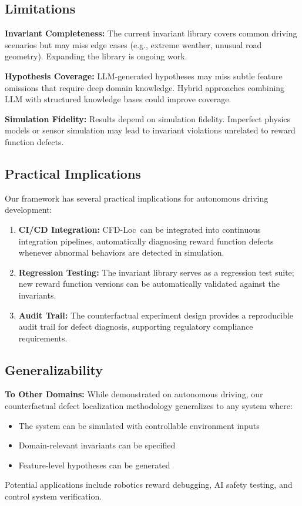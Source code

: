 \documentclass[conference]{IEEEtran}
\theoremstyle{plain}
\newcommand{\methodname}{CFD-Loc}
\begin{document}
\subsection{Limitations}

\textbf{Invariant Completeness:} The current invariant library covers common driving scenarios but may miss edge cases (e.g., extreme weather, unusual road geometry). Expanding the library is ongoing work.

\textbf{Hypothesis Coverage:} LLM-generated hypotheses may miss subtle feature omissions that require deep domain knowledge. Hybrid approaches combining LLM with structured knowledge bases could improve coverage.

\textbf{Simulation Fidelity:} Results depend on simulation fidelity. Imperfect physics models or sensor simulation may lead to invariant violations unrelated to reward function defects.

\subsection{Practical Implications}

Our framework has several practical implications for autonomous driving development:

\begin{enumerate}[nosep]
    \item \textbf{CI/CD Integration:} \methodname\ can be integrated into continuous integration pipelines, automatically diagnosing reward function defects whenever abnormal behaviors are detected in simulation.
    \item \textbf{Regression Testing:} The invariant library serves as a regression test suite; new reward function versions can be automatically validated against the invariants.
    \item \textbf{Audit Trail:} The counterfactual experiment design provides a reproducible audit trail for defect diagnosis, supporting regulatory compliance requirements.
\end{enumerate}

\subsection{Generalizability}

\textbf{To Other Domains:} While demonstrated on autonomous driving, our counterfactual defect localization methodology generalizes to any system where:
\begin{itemize}[nosep]
    \item The system can be simulated with controllable environment inputs
    \item Domain-relevant invariants can be specified
    \item Feature-level hypotheses can be generated
\end{itemize}
Potential applications include robotics reward debugging, AI safety testing, and control system verification.
\end{document}
